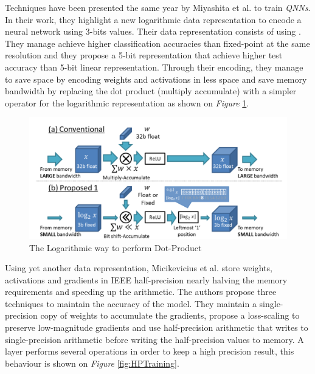 Techniques have been presented the same year by Miyashita et al. \cite{Miyashita2016} to train \emph{QNNs}. In their work, they highlight a new logarithmic data representation to encode a neural network using 3-bits values. Their data representation consists of using . They manage achieve higher classification accuracies than fixed-point at the same resolution and they propose a 5-bit representation that achieve higher test accuracy than 5-bit linear representation. Through their encoding, they manage to save space by encoding weights and activations in less space and save memory bandwidth by replacing the dot product (multiply accumulate) with a simpler operator for the logarithmic representation as shown on \emph{Figure} \ref{fig:DotProdLog}.

\begin{figure}[htbp]
	\centering
		\includegraphics[width=\textwidth]{Figures/DotProdLog.png}
	\caption[Logarithmic Dot Product]{The Logarithmic way to perform Dot-Product \cite{Miyashita2016}}
	\label{fig:DotProdLog}
\end{figure}

Using yet another data representation, Micikevicius et al. \cite{Micikevicius2017} store weights, activations and gradients in IEEE half-precision nearly halving the memory requirements and speeding up the arithmetic. The authors propose three techniques to maintain the accuracy of the model. They maintain a single-precision copy of weights to accumulate the gradients, propose a loss-scaling to preserve low-magnitude gradients and use half-precision arithmetic that writes to single-precision arithmetic before writing the half-precision values to memory. A layer performs several operations in order to keep a high precision result, this behaviour is shown on \emph{Figure} \ref{fig:HPTraining}.

